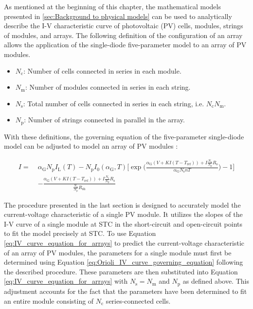 
As mentioned at the beginning of this chapter, the mathematical models
presented in \ref{sec:Background to physical models} can
be used to analytically describe the I-V characteristic curve
of photovoltaic (PV) cells, modules, strings of modules, and arrays.
The following definition of the configuration of an array allows
the application of the single-diode five-parameter model to an array
of PV modules.

\begin{itemize}
    \item \(N_\text{c}\): Number of cells connected in series in each module.
    \item \(N_\text{m}\): Number of modules connected in series in each string.
    \item \(N_\text{s}\): Total number of cells connected in series in each string, i.e. \(N_\text{c} N_\text{m}\).
    \item \(N_\text{p}\): Number of strings connected in parallel in the array.
\end{itemize}

\noindent
With these definitions, the governing equation of the five-parameter
single-diode model can be adjusted to model an array of PV modules
\cite{Ma2014_2, Tian2012}:

\begin{align}
    I = \; &\alpha_{\text{G}}N_\text{p}I_{\text{L}}(T) - N_\text{p}I_{0}(\alpha_{\text{G}}, T)\Biggl[\exp\biggl(\frac{\alpha_{\text{G}}(V + KI(T - T_{\text{ref}}))+I\frac{N_\text{s}}{N_\text{p}}R_{\text{s}}}{\alpha_{\text{G}}N_\text{s}nT}\biggr) - 1\Biggr] \nonumber \\
                       &- \frac{\alpha_{\text{G}}(V + KI(T - T_{\text{ref}}))+I\frac{N_\text{s}}{N_\text{p}}R_{\text{s}}}{\frac{N_\text{s}}{N_\text{p}}R_{\text{sh}}}
    \label{eq:IV_curve_equation_for_arrays}
\end{align}

\noindent
The procedure presented in the last section is designed to accurately
model the current-voltage characteristic of a single PV module.
It utilizes the slopes of the I-V curve of a single module at
STC in the short-circuit and open-circuit points to fit the model
precisely at STC. To use Equation \ref{eq:IV_curve_equation_for_arrays}
to predict the current-voltage characteristic of an array of PV modules,
the parameters for a single module must first be determined
using Equation \ref{eq:Orioli_IV_curve_governing_equation}
following the described procedure. These parameters are then
substituted into Equation \ref{eq:IV_curve_equation_for_arrays}
with \(N_\text{s} = N_\text{m}\) and \(N_\text{p}\) as defined above. This adjustment
accounts for the fact that the parameters have been determined
to fit an entire module consisting of \(N_\text{c}\) series-connected cells.


